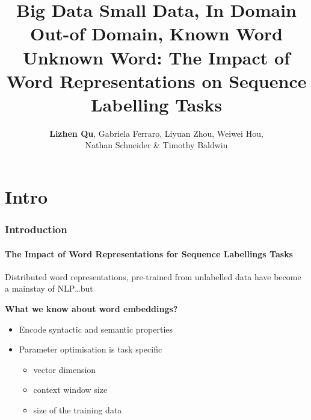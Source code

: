 \documentclass{beamer}
\title[Word Representations on Sequence Labelling Tasks] %
{Big Data Small Data, In Domain Out-of Domain, Known Word Unknown
  Word: The Impact of Word Representations on Sequence Labelling Tasks}
\author[Lizhen Qu et al.]{\textbf{Lizhen Qu}, Gabriela Ferraro, Liyuan Zhou, Weiwei Hou, \\
Nathan Schneider \& Timothy Baldwin }
\begin{document}
{
\begin{frame}
  \titlepage
\end{frame}
}





\section{Intro}
\label{sec:intro}



\begin{frame}
\frametitle{\textbf{Introduction}}
  \framesubtitle{The Impact of Word Representations for Sequence Labellings Tasks}

\vspace{-1.5cm}
Distributed word representations, pre-trained from unlabelled data 
have become a mainstay of NLP\ldots but

\vspace{0.5cm}
\textbf{What we know about word embeddings?}
\vspace{0.5cm}

\begin{itemize}

\item[\ding{224}] Encode syntactic and semantic properties
\item[\ding{224}] Parameter optimisation is task specific
	\begin{itemize}
	\item[\ding{51}] vector dimension %
	\item[\ding{51}] context window size
	\item[\ding{51}] size of the training data
	\end{itemize}
\end{itemize}  
\end{frame}
\end{document}
